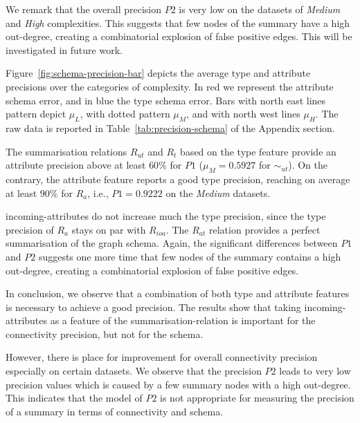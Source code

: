 We remark that the overall precision $P2$ is very low on the datasets of \emph{Medium} and \emph{High} complexities. This suggests that few nodes of the summary have a high out-degree, creating a combinatorial explosion of false positive edges. This will be investigated in future work.




Figure~\ref{fig:schema-precision-bar} depicts the average type and attribute precisions over the categories of complexity.
In red we represent the attribute schema error, and in blue the type schema error. Bars with north east lines pattern depict $\mu_{L}$, with dotted pattern $\mu_{M}$, and with north west lines $\mu_{H}$.
The raw data is reported in Table~\ref{tab:precision-schema} of the Appendix section.

The summarisation relations $R_{ut}$ and $R_t$ based on the type feature provide an attribute precision above at least $60\%$ for $P1$ ($\mu_M=0.5927$ for $\sim_{ut}$).
On the contrary, the attribute feature reports a good type precision, reaching on average at least $90\%$ for $R_a$, i.e., $P1=0.9222$ on the \emph{Medium} datasets.

\gls{incoming-attributes} do not increase much the type precision, since the type precision of $R_a$ stays on par with $R_{ioa}$. The $R_{at}$ relation provides a perfect summarisation of the graph schema. Again, the significant differences between $P1$ and $P2$ suggests one more time that few nodes of the summary contains a high out-degree, creating a combinatorial explosion of false positive edges.




In conclusion, we observe that a combination of both type and attribute features is necessary to achieve a good precision. The results show that taking \gls{incoming-attributes} as a feature of the \gls{summarisation-relation} is important for the connectivity precision, but not for the schema.

However, there is place for improvement for overall connectivity precision especially on certain datasets. We observe that the precision $P2$ leads to very low precision values which is caused by a few summary nodes with a high out-degree. This indicates that the model of $P2$ is not appropriate for measuring the precision of a summary in terms of connectivity and schema.

